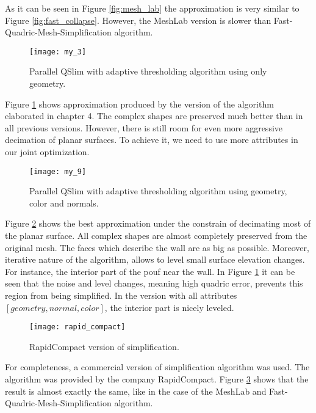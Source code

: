 As it can be seen in Figure \ref{fig:mesh_lab} the approximation is very similar to Figure \ref{fig:fast_collapse}. However, the MeshLab version is slower than Fast-Quadric-Mesh-Simplification algorithm.

\begin{figure}[H]
  \begin{center}
    \texttt{[image: my\_3]}
    \caption{Parallel QSlim with adaptive thresholding algorithm using only geometry.}
    \label{fig:my_3}
  \end{center}
\end{figure}

Figure \ref{fig:my_3} shows approximation produced by the version of the algorithm elaborated in chapter 4. The complex shapes are preserved much better than in all previous versions. However, there is still room for even more aggressive decimation of planar surfaces. To achieve it, we need to use more attributes in our joint optimization.

\begin{figure}[H]
  \begin{center}
    \texttt{[image: my\_9]}
    \caption{Parallel QSlim with adaptive thresholding algorithm using geometry, color and normals.}
    \label{fig:my_9}
  \end{center}
\end{figure}

Figure \ref{fig:my_9} shows the best approximation under the constrain of decimating most of the planar surface. All complex shapes are almost completely preserved from the original mesh. The faces which describe the wall are as big as possible. Moreover, iterative nature of the algorithm, allows to level small surface elevation changes. For instance, the interior part of the pouf near the wall. In Figure \ref{fig:my_3} it can be seen that the noise and level changes, meaning high quadric error, prevents this region from being simplified. In the version with all attributes $[geometry, normal, color]$, the interior part is nicely leveled.

\begin{figure}[H]
  \begin{center}
    \texttt{[image: rapid\_compact]}
    \caption{RapidCompact version of simplification.}
    \label{fig:rapid_compact}
  \end{center}
\end{figure}

For completeness, a commercial version of simplification algorithm was used. The algorithm was provided by the company RapidCompact. Figure \ref{fig:rapid_compact} shows that the result is almost exactly the same, like in the case of the MeshLab and Fast-Quadric-Mesh-Simplification algorithm.
